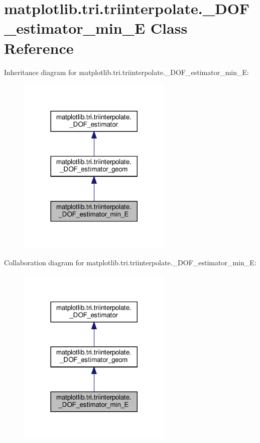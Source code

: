 \hypertarget{classmatplotlib_1_1tri_1_1triinterpolate_1_1__DOF__estimator__min__E}{}\section{matplotlib.\+tri.\+triinterpolate.\+\_\+\+D\+O\+F\+\_\+estimator\+\_\+min\+\_\+E Class Reference}
\label{classmatplotlib_1_1tri_1_1triinterpolate_1_1__DOF__estimator__min__E}


Inheritance diagram for matplotlib.\+tri.\+triinterpolate.\+\_\+\+D\+O\+F\+\_\+estimator\+\_\+min\+\_\+E\+:
\nopagebreak
\begin{figure}[H]
\begin{center}
\leavevmode
\includegraphics[width=209pt]{classmatplotlib_1_1tri_1_1triinterpolate_1_1__DOF__estimator__min__E__inherit__graph}
\end{center}
\end{figure}


Collaboration diagram for matplotlib.\+tri.\+triinterpolate.\+\_\+\+D\+O\+F\+\_\+estimator\+\_\+min\+\_\+E\+:
\nopagebreak
\begin{figure}[H]
\begin{center}
\leavevmode
\includegraphics[width=209pt]{classmatplotlib_1_1tri_1_1triinterpolate_1_1__DOF__estimator__min__E__coll__graph}
\end{center}
\end{figure}
